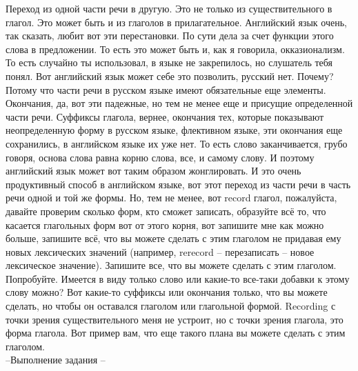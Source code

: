 \documentclass[main.tex]{subfiles}
\begin{document}
Переход из одной части речи в другую.
Это не только из существительного в глагол.
Это может быть и из глаголов в прилагательное.
Английский язык очень, так сказать, любит вот эти перестановки.
По сути дела за счет функции этого слова в предложении.
То есть это может быть и, как я говорила, окказионализм.
То есть случайно ты использовал, в языке не закрепилось, но слушатель тебя понял.
Вот английский язык может себе это позволить, русский нет.
Почему?
Потому что части речи в русском языке имеют обязательные еще элементы.
Окончания, да, вот эти падежные, но тем не менее еще и присущие определенной части речи.
Суффиксы глагола, вернее, окончания тех, которые показывают неопределенную форму в русском языке, флективном языке, эти окончания еще сохранились, в английском языке их уже нет.
То есть слово заканчивается, грубо говоря, основа слова равна корню слова, все, и самому слову.
И поэтому английский язык может вот таким образом жонглировать.
И это очень продуктивный способ в английском языке, вот этот переход из части речи в часть речи одной и той же формы.
Но, тем не менее, вот record глагол, пожалуйста, давайте проверим сколько форм, кто сможет записать, образуйте всё то, что касается глагольных форм вот от этого корня, вот запишите мне как можно больше, запишите всё, что вы можете сделать с этим глаголом не придавая ему новых лексических значений (например, rerecord -- перезаписать -- новое лексическое значение).
Запишите все, что вы можете сделать с этим глаголом.
Попробуйте.
Имеется в виду только слово или какие-то все-таки добавки к этому слову можно?
Вот какие-то суффиксы или окончания только, что вы можете сделать, но чтобы он оставался глаголом или глагольной формой.
Recording с точки зрения существительного меня не устроит, но с точки зрения глагола, это форма глагола.
Вот пример вам, что еще такого плана вы можете сделать с этим глаголом.
\\

--Выполнение задания --
\\
\end{document}
